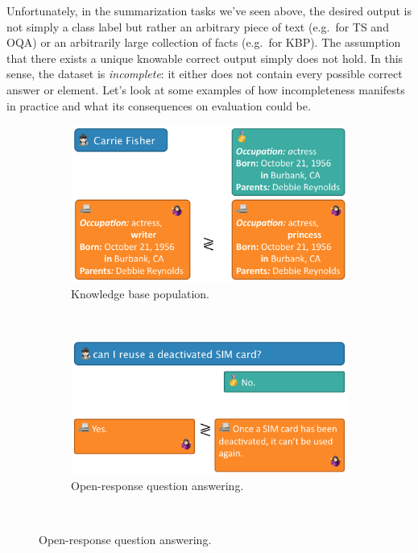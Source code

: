 Unfortunately, in the summarization tasks we've seen above, the desired output is not simply a class label but rather an arbitrary piece of text (e.g.\ for TS and OQA) or an arbitrarily large collection of facts (e.g.\ for KBP).
The assumption that there exists a unique knowable correct output simply does not hold.
In this sense, the dataset is \textit{incomplete}: it either does not contain every possible correct answer or element.
Let's look at some examples of how incompleteness manifests in practice and what its consequences on evaluation could be.

\begin{figure}
  \centering
  \begin{subfigure}{0.65\textwidth}
    \includegraphics[width=\textwidth]{figures/example-kbp}
    \caption{\label{fig:intro:example-kbp} Knowledge base population.}
  \end{subfigure} \\
  \begin{subfigure}{0.65\textwidth}%
    \includegraphics[width=\textwidth]{figures/example-qa}
    \caption{\label{fig:intro:example-qa} Open-response question answering.}
  \end{subfigure} \\

\end{figure}
